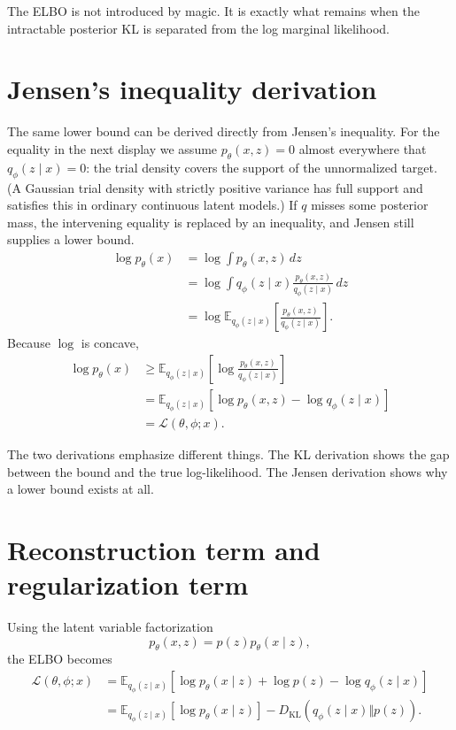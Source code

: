 \begin{remark}
The ELBO is not introduced by magic.  It is exactly what remains when the intractable posterior KL is separated from the log marginal likelihood.
\end{remark}

\section{Jensen's inequality derivation}

The same lower bound can be derived directly from Jensen's inequality. For the equality in the next display we assume $p_\theta(x,z)=0$ almost everywhere that $q_\phi(z\mid x)=0$: the trial density covers the support of the unnormalized target. (A Gaussian trial density with strictly positive variance has full support and satisfies this in ordinary continuous latent models.) If $q$ misses some posterior mass, the intervening equality is replaced by an inequality, and Jensen still supplies a lower bound.
\[
\begin{aligned}
\log p_\theta(x)
&=\log\int p_\theta(x,z)\,dz\\
&=\log\int q_\phi(z\mid x)
\frac{p_\theta(x,z)}{q_\phi(z\mid x)}\,dz\\
&=\log\mathbb E_{q_\phi(z\mid x)}
\left[\frac{p_\theta(x,z)}{q_\phi(z\mid x)}\right].
\end{aligned}
\]
Because \(\log\) is concave,
\[
\begin{aligned}
\log p_\theta(x)
&\ge
\mathbb E_{q_\phi(z\mid x)}
\left[\log\frac{p_\theta(x,z)}{q_\phi(z\mid x)}\right]\\
&=\mathbb E_{q_\phi(z\mid x)}
\left[\log p_\theta(x,z)-\log q_\phi(z\mid x)\right]\\
&=\mathcal L(\theta,\phi;x).
\end{aligned}
\]

The two derivations emphasize different things.  The KL derivation shows the gap between the bound and the true log-likelihood.  The Jensen derivation shows why a lower bound exists at all.

\section{Reconstruction term and regularization term}

Using the latent variable factorization
\[
  p_\theta(x,z)=p(z)p_\theta(x\mid z),
\]
the ELBO becomes
\[
\begin{aligned}
\mathcal L(\theta,\phi;x)
&=\mathbb E_{q_\phi(z\mid x)}
\left[\log p_\theta(x\mid z)+\log p(z)-\log q_\phi(z\mid x)\right]\\
&=\mathbb E_{q_\phi(z\mid x)}[\log p_\theta(x\mid z)]
-D_{\mathrm{KL}}(q_\phi(z\mid x)\Vert p(z)).
\end{aligned}
\]

